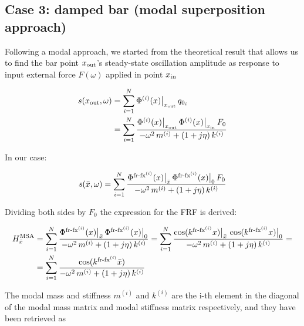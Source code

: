 \documentclass[a4paper,12pt,oneside]{article}
\begin{document}
\begin{figure}[h]
	\vspace{50pt}
	\centering
	\def\svgwidth{\columnwidth}
	
\end{figure}

\subsection*{Case 3: damped bar (modal superposition approach)}

Following a modal approach, we started from the theoretical result that allows us to find the bar point $ x_\textup{out} $'s steady-state oscillation amplitude as response to input external force $ F(\omega) $ applied in point $ x_\textup{in} $

\[ \begin{split}
	s(x_\textup{out}, \omega) & =
		\sum_{i=1}^N \Phi^{(i)}(x)\big|_{x_\textup{out}} \, q_{0_i} \\
	& = \sum_{i=1}^N \frac{\Phi^{(i)}(x)\big|_{x_\textup{out}} \,
		\Phi^{(i)}(x)\big|_{x_\textup{in}} \, F_0}
		{-\omega^2 \, m^{(i)} + (1 + j \eta) \, k^{(i)}}
\end{split} \]

In our case:

\[ \begin{split}
	s(\bar{x},\omega) =
		\sum_{i=1}^N \frac{\Phi^{\textup{fr-fx}^{(i)}}(x)\big|_{\bar{x}} \,
		\Phi^{\textup{fr-fx}^{(i)}}(x)\big|_0 \, F_0}
		{-\omega^2 \, m^{(i)} + (1 + j \eta) \, k^{(i)}}
\end{split} \]

Dividing both sides by $ F_0 $ the expression for the FRF is derived:

\[ \begin{split}
	H^\textup{MSA}_{\bar{x}} & =
		\sum_{i=1}^N \frac{\Phi^{\textup{fr-fx}^{(i)}}(x)\big|_{\bar{x}} \,
		\Phi^{\textup{fr-fx}^{(i)}}(x)\big|_0}
		{-\omega^2 \, m^{(i)} + (1 + j \eta) \, k^{(i)}} =
		\sum_{i=1}^N \frac{\cos(k^{\textup{fr-fx}^{(i)}} x)\big|_{\bar{x}} \,
		\cos(k^{\textup{fr-fx}^{(i)}} x)\big|_0}
		{-\omega^2 \, m^{(i)} + (1 + j \eta) \, k^{(i)}} = \\
	& = \sum_{i=1}^N \frac{\cos(k^{\textup{fr-fx}^{(i)}} \bar{x})}
		{-\omega^2 \, m^{(i)} + (1 + j \eta) \, k^{(i)}}
\end{split} \]

\clearpage

The modal mass and stiffness $ m^{(i)} $ and $ k^{(i)} $ are the i-th element in the diagonal of the modal mass matrix and modal stiffness matrix respectively, and they have been retrieved as
\end{document}
